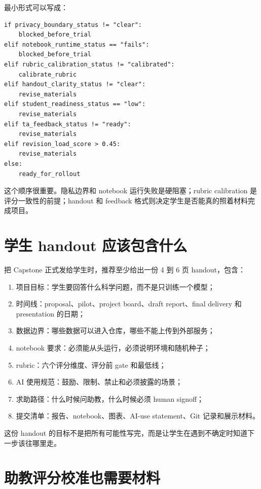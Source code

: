 最小形式可以写成：

\begin{examplebox}
\begin{lstlisting}[style=pythonstyle]
if privacy_boundary_status != "clear":
    blocked_before_trial
elif notebook_runtime_status == "fails":
    blocked_before_trial
elif rubric_calibration_status != "calibrated":
    calibrate_rubric
elif handout_clarity_status != "clear":
    revise_materials
elif student_readiness_status == "low":
    revise_materials
elif ta_feedback_status != "ready":
    revise_materials
elif revision_load_score > 0.45:
    revise_materials
else:
    ready_for_rollout
\end{lstlisting}
\end{examplebox}

这个顺序很重要。隐私边界和 notebook 运行失败是硬阻塞；rubric calibration 是评分一致性的前提；handout 和 feedback 格式则决定学生是否能真的照着材料完成项目。

\section{学生 handout 应该包含什么}

把 Capstone 正式发给学生时，推荐至少给出一份 4 到 6 页 handout，包含：

\begin{enumerate}
    \item 项目目标：学生要回答什么科学问题，而不是只训练一个模型；
    \item 时间线：proposal、pilot、project board、draft report、final delivery 和 presentation 的日期；
    \item 数据边界：哪些数据可以进入仓库，哪些不能上传到外部服务；
    \item notebook 要求：必须能从头运行，必须说明环境和随机种子；
    \item rubric：六个评分维度、评分前 gate 和最低线；
    \item AI 使用规范：鼓励、限制、禁止和必须披露的场景；
    \item 求助路径：什么时候问助教，什么时候必须 human signoff；
    \item 提交清单：报告、notebook、图表、AI-use statement、Git 记录和展示材料。
\end{enumerate}

这份 handout 的目标不是把所有可能性写完，而是让学生在遇到不确定时知道下一步该往哪里走。

\section{助教评分校准也需要材料}

